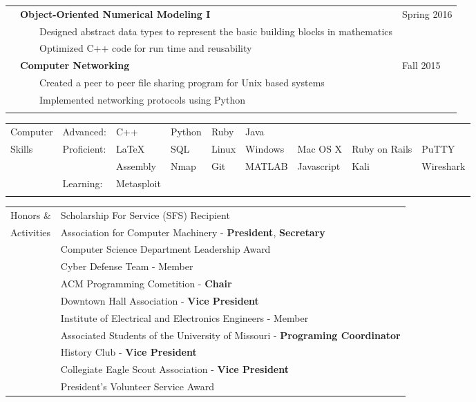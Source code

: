 \documentclass[10.5pt, arial]{article}
\newcommand{\tabitem}{~~\llap{\textbullet}~~}
\begin{document}
\begin{tabular}{p{1.5cm} p{13.2cm} l}
			& \textbf{Object-Oriented Numerical Modeling I} 					& Spring 2016 			\\
			& \tabitem Designed abstract data types to represent the basic building blocks in mathematics & \\
			& \tabitem Optimized C++ code for run time and reusability 		& 						\\

			& \textbf{Computer Networking} 										& Fall 2015 			\\
			& \tabitem Created a peer to peer file sharing program for Unix based systems 		& 		\\
			& \tabitem Implemented networking protocols using Python 						& 						\\
						\\
\end{tabular}

\begin{tabular}{p{1.5cm} l l l l l l l l}
Computer	& Advanced: 	& C++ 		& Python 	& Ruby		& Java			& 			& 					\\
Skills		& Proficient:	& \LaTeX	 	& SQL 		& Linux 	& Windows 	& Mac OS X 	& Ruby on Rails	& 				PuTTY  	\\
			&			 	& Assembly 	& Nmap 		& Git 		& MATLAB	& Javascript& Kali			& Wireshark	\\
            & Learning:		& Metasploit&       & 			& 			& 			& 					\\ \\
\end{tabular}

\begin{tabular}{p{1.5cm} l}
Honors \&	& Scholarship For Service (SFS) Recipient 																	\\
Activities	& Association for Computer Machinery - \textbf{President}, \textbf{Secretary}								\\
			& Computer Science Department Leadership Award 																\\
			& Cyber Defense Team - Member																				\\
			& ACM Programming Cometition - \textbf{Chair}																\\
			& Downtown Hall Association - \textbf{Vice President}														\\
			& Institute of Electrical and Electronics Engineers - Member												\\
			& Associated Students of the University of Missouri - \textbf{Programing Coordinator} 						\\
			& History Club - \textbf{Vice President} 																	\\
			& Collegiate Eagle Scout Association - \textbf{Vice President} 		 										\\
			& President's Volunteer Service Award																		\\
\end{tabular}
\end{document}
